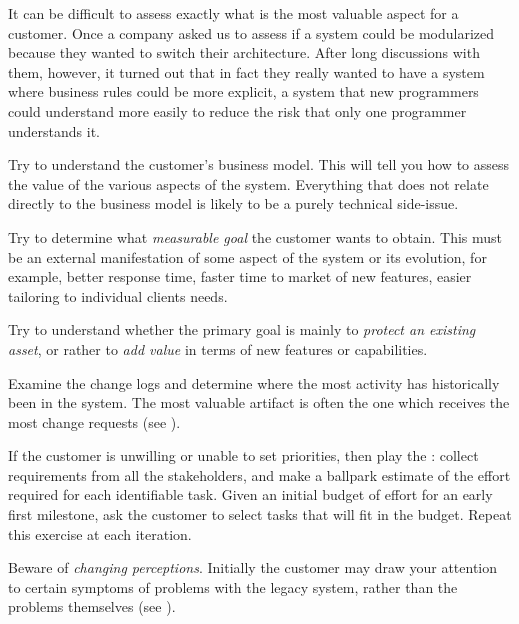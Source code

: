 \documentclass[a4paper,10pt,twoside]{book}
\begin{document}
\begin{bulletlist}
  \item It can be difficult to assess exactly what is the most valuable aspect for a customer. Once a company asked us to assess if a system could be modularized because they wanted to switch their architecture. After long discussions with them, however, it turned out that in fact they really wanted to have a system where business rules could be more explicit, a system that new programmers could understand more easily to reduce the risk that only one programmer understands it.

  \item Try to understand the customer's business model. This will tell you how to assess the value of the various aspects of the system. Everything that does not relate directly to the business model is likely to be a purely technical side-issue. 

  \item Try to determine what \emph{measurable goal} the customer wants to obtain. This must be an external manifestation of some aspect of the system or its evolution, for example, better response time, faster time to market of new features, easier tailoring to individual clients needs.

  \item Try to understand whether the primary goal is mainly to \emph{protect an existing asset}, or rather to \emph{add value} in terms of new features or capabilities.

  \item Examine the change logs and determine where the most activity has historically been in the system. The most valuable artifact is often the one which receives the most change requests (see ). 

  \item If the customer is unwilling or unable to set priorities, then play the  \cite{Beck01a}: collect requirements from all the stakeholders, and make a ballpark estimate of the effort required for each identifiable task. Given an initial budget of effort for an early first milestone, ask the customer to select tasks that will fit in the budget. Repeat this exercise at each iteration.

  \item Beware of \emph{changing perceptions}. Initially the customer may draw your attention to certain symptoms of problems with the legacy system, rather than the problems themselves (see ). 

\end{bulletlist}
\end{document}
